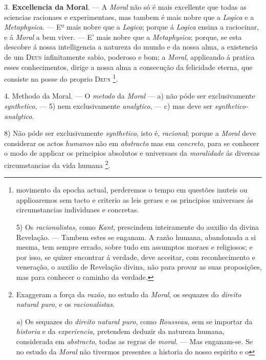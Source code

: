  3. \textbf{Excellencia da Moral}. --- A \emph{Moral} não só é mais excellente que todas as sciencias racionaes e experimentaes, mas tambem é mais nobre que a \emph{Logica} e a \emph{Metaphysica}. --- Eº mais nobre que a \emph{Logica}; porque á \emph{Logica} ensina a raciocinar, e á \emph{Moral} a bem viver. --- E' mais nobre que a \emph{Metaphysica}; porque, se esta descobre á nossa intelligencia a natureza do mundo e da nossa alma, a existencia de um \textsc{Deus} infinitamente sabio, poderoso e bom; a \emph{Moral}, applieando á pratica esses conhecimentos, dirige a nossa alma a consecução da felicidade eterna, que consiste na posse do proprio \textsc{Deus} \footnote{movimento da epocha actual, perderemos o tempo em questões inuteis ou applioaremos sem tacto e criterio as leis geraes e os principios universaes ás circumstancias individuaes e concretas.\par 5) Os \emph{racionalistas}, como \emph{Kant}, prescindem inteiramente do auxilio da divina Revelação. --- Tambem estes se enganam. A razão humana, abandonada a si mesma, tem sempre errado, sobre tudo em assumptos moraes e religiosos; e por isso, se quizer encontrar á verdade, deve acceitar, com reconhecimento e veneração, o auxilio de Revelação divina, não para provar as suas proposições, mas para conhecer o caminho da verdade.}.

4. Methodo da Moral. --- O \emph{metodo} da \emph{Moral} --- a) não póde ser exclusivamente \emph{synthetico}, --- 5) nem exclusivamente \emph{analytico}, --- c) mas deve ser \emph{synthetico-analytico}.

\textbar{} 8) Não póde ser exclusivamente \emph{synthetico}, isto é, \emph{racional}; porque a \emph{Moral} deve considerar os actos \emph{humanos} não em \emph{abstracto} mas em \emph{concreto}, para se conhecer o modo de applicar os principios absolutos e universaes da \emph{moralidade} ás diversas circumstancias da vida humana \footnote{Exaggeram a força da \emph{razão}, no estudo da \emph{Moral}, os sequazes do \emph{direito natural puro}, e os \emph{racionalistas}.\par \emph{a}) Os sequazes do \emph{direito natural puro}, como \emph{Rousseau}, sem se importar da \emph{historia} e da \emph{experiencia}, pretendem deduzir da natureza humana, considerada em \emph{abstracto}, todas as regras de \emph{moral}. --- Mas enganam-se. Se no estudo da \emph{Moral} não tivermos presentes a historia do nosso espirito e o}.

